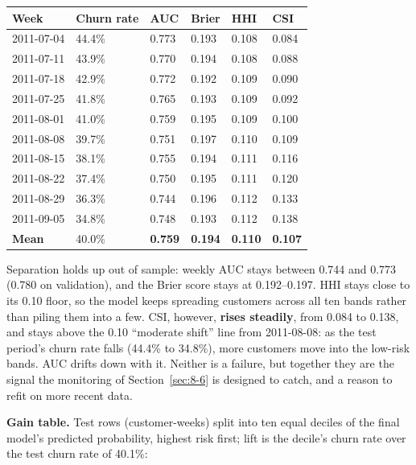 \begin{center}
\begin{tabular}{@{}p{2.4cm}p{1.6cm}p{1.6cm}p{1.6cm}p{1.6cm}p{1.6cm}@{}}
    \toprule
    Week & Churn rate & AUC & Brier & HHI & CSI \\
    \midrule
    2011-07-04 & 44.4\% & 0.773 & 0.193 & 0.108 & 0.084 \\
    2011-07-11 & 43.9\% & 0.770 & 0.194 & 0.108 & 0.088 \\
    2011-07-18 & 42.9\% & 0.772 & 0.192 & 0.109 & 0.090 \\
    2011-07-25 & 41.8\% & 0.765 & 0.193 & 0.109 & 0.092 \\
    2011-08-01 & 41.0\% & 0.759 & 0.195 & 0.109 & 0.100 \\
    2011-08-08 & 39.7\% & 0.751 & 0.197 & 0.110 & 0.109 \\
    2011-08-15 & 38.1\% & 0.755 & 0.194 & 0.111 & 0.116 \\
    2011-08-22 & 37.4\% & 0.750 & 0.195 & 0.111 & 0.120 \\
    2011-08-29 & 36.3\% & 0.744 & 0.196 & 0.112 & 0.133 \\
    2011-09-05 & 34.8\% & 0.748 & 0.193 & 0.112 & 0.138 \\
    \midrule
    \textbf{Mean} & 40.0\% & \textbf{0.759} & \textbf{0.194} & \textbf{0.110} & \textbf{0.107} \\
    \bottomrule
\end{tabular}
\end{center}

Separation holds up out of sample: weekly AUC stays between 0.744 and 0.773 (0.780 on validation), and the Brier score stays at 0.192--0.197. HHI stays close to its 0.10 floor, so the model keeps spreading customers across all ten bands rather than piling them into a few. CSI, however, \textbf{rises steadily}, from 0.084 to 0.138, and stays above the 0.10 ``moderate shift'' line from 2011-08-08: as the test period's churn rate falls (44.4\% to 34.8\%), more customers move into the low-risk bands. AUC drifts down with it. Neither is a failure, but together they are the signal the monitoring of Section~\ref{sec:8-6} is designed to catch, and a reason to refit on more recent data.

\textbf{Gain table.} Test rows (customer-weeks) split into ten equal deciles of the final model's predicted probability, highest risk first; lift is the decile's churn rate over the test churn rate of 40.1\%:

